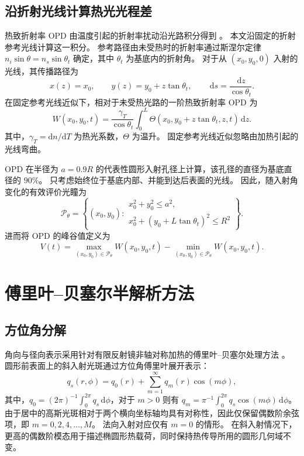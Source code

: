 \documentclass{optica-article}
\newcommand{\dd}{\,\mathrm{d}}
\begin{document}
\subsection{沿折射光线计算热光光程差}
热致折射率 OPD 由温度引起的折射率扰动沿光路积分得到 \cite{hellovinet1990,malacarne2012}。
本文沿固定的折射参考光线计算这一积分。
参考路径由未受热时的折射率通过斯涅尔定律 $n_i\sin\theta=n_s\sin\theta_t$ 确定，其中 $\theta_t$ 为基底内的折射角。
对于从 $(x_0,y_0,0)$ 入射的光线，其传播路径为
\begin{equation}
 x(z)=x_0,\qquad
 y(z)=y_0+z\tan\theta_t,\qquad
 \dd s=\frac{\dd z}{\cos\theta_t}.
 \label{eq:ray}
\end{equation}
在固定参考光线近似下，相对于未受热光路的一阶热致折射率 OPD 为
\begin{equation}
 W(x_0,y_0,t)
 =
 \frac{\gamma_T}{\cos\theta_t}
 \int_0^L
 \Theta(x_0,y_0+z\tan\theta_t,z,t)\dd z.
 \label{eq:opd}
\end{equation}
其中，$\gamma_T=\mathrm dn/\mathrm dT$ 为热光系数，$\Theta$ 为温升。
固定参考光线近似忽略由加热引起的光线弯曲。

OPD 在半径为 $a=0.9R$ 的代表性圆形入射孔径上计算，该孔径的直径为基底直径的 $90\%$。
只考虑始终位于基底内部、并能到达后表面的光线。
因此，随入射角变化的有效评价光瞳为
\begin{equation}
 \mathcal P_\theta=
 \left\{
 (x_0,y_0):
 \begin{array}{l}
 x_0^2+y_0^2\le a^2,\\
 x_0^2+(y_0+L\tan\theta_t)^2\le R^2
 \end{array}
 \right\}.
 \label{eq:pupil}
\end{equation}
进而将 OPD 的峰谷值定义为
\begin{equation}
 V(t)=
 \max_{(x_0,y_0)\in\mathcal P_\theta}W(x_0,y_0,t)
 -
 \min_{(x_0,y_0)\in\mathcal P_\theta}W(x_0,y_0,t).
 \label{eq:pv}
\end{equation}

\section{傅里叶--贝塞尔半解析方法}
\subsection{方位角分解}
角向与径向表示采用针对有限反射镜非轴对称加热的傅里叶--贝塞尔处理方法 \cite{vinet2009}。
圆形前表面上的斜入射光斑通过方位角傅里叶展开表示：
\begin{equation}
 q_s(r,\phi)=q_0(r)+\sum_{m=1}^{\infty}q_m(r)\cos(m\phi),
 \label{eq:fourier}
\end{equation}
其中，$q_0=(2\pi)^{-1}\int_0^{2\pi}q_s\dd\phi$，对于 $m>0$ 则有 $q_m=\pi^{-1}\int_0^{2\pi}q_s\cos(m\phi)\dd\phi$。
由于居中的高斯光斑相对于两个横向坐标轴均具有对称性，因此仅保留偶数阶余弦项，即 $m=0,2,4,\ldots,M$。
法向入射对应仅有 $m=0$ 的情形。
在斜入射情况下，更高的偶数阶模态用于描述椭圆形热载荷，同时保持热传导所用的圆形几何域不变。
\end{document}
